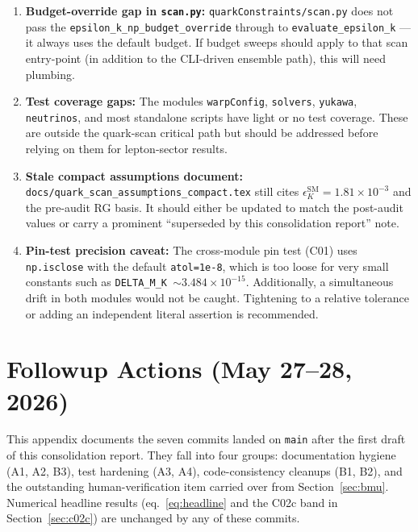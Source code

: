 \documentclass[11pt]{article}
\newcommand{\eK}{\epsilon_K}
\begin{document}
\begin{enumerate}
  \item \textbf{Budget-override gap in \texttt{scan.py}:}
    \texttt{quarkConstraints/scan.py} does not pass the
    \texttt{epsilon\_k\_np\_budget\_override} through to
    \texttt{evaluate\_epsilon\_k} --- it always uses the default
    budget.  If budget sweeps should apply to that scan entry-point
    (in addition to the CLI-driven ensemble path), this will need
    plumbing.

  \item \textbf{Test coverage gaps:} The modules \texttt{warpConfig},
    \texttt{solvers}, \texttt{yukawa}, \texttt{neutrinos}, and most
    standalone scripts have light or no test coverage.  These are
    outside the quark-scan critical path but should be addressed
    before relying on them for lepton-sector results.

  \item \textbf{Stale compact assumptions document:}
    \texttt{docs/quark\_scan\_assumptions\_compact.tex} still cites
    $\eK^{\mathrm{SM}} = 1.81\times10^{-3}$ and the pre-audit RG
    basis.  It should either be updated to match the post-audit
    values or carry a prominent ``superseded by this consolidation
    report'' note.

  \item \textbf{Pin-test precision caveat:} The cross-module pin test
    (C01) uses \texttt{np.isclose} with the default
    \texttt{atol=1e-8}, which is too loose for very small constants
    such as \texttt{DELTA\_M\_K $\sim 3.484\times10^{-15}$}.
    Additionally, a simultaneous drift in both modules would not be
    caught.  Tightening to a relative tolerance or adding an
    independent literal assertion is recommended.
\end{enumerate}


\section{Followup Actions (May 27--28, 2026)}
\label{sec:followups}

This appendix documents the seven commits landed on \texttt{main} after
the first draft of this consolidation report.  They fall into four
groups: documentation hygiene (A1, A2, B3), test hardening (A3, A4),
code-consistency cleanups (B1, B2), and the outstanding human-verification
item carried over from Section~\ref{sec:bmu}.  Numerical headline results
(eq.~\ref{eq:headline} and the C02c band in
Section~\ref{sec:c02c}) are unchanged by any of these commits.
\end{document}
